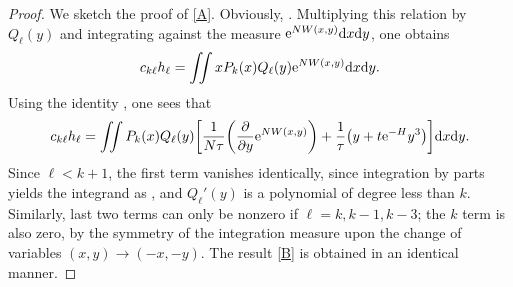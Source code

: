 \documentclass[10pt,a4paper]{amsart}
\numberwithin{equation}{section}
\begin{document}
\begin{proof}
 We sketch the proof of \eqref{A}. Obviously, . Multiplying this relation by $Q_{\ell}(y)$ and integrating against the measure ${\rm e}^{NW(x,y)}{\rm d}x{\rm d}y$, one obtains
 \begin{equation*}
 c_{k\ell}h_{\ell} =\iint xP_k(x) Q_{\ell}(y) {\rm e}^{NW(x,y)}{\rm d}x{\rm d}y.
 \end{equation*}
 Using the identity , one sees
 that
 \begin{equation*}
 c_{k\ell}h_{\ell} = \iint P_k(x) Q_{\ell}(y)\biggl[\frac{1}{N \tau}\biggl(\frac{\partial}{\partial y} {\rm e}^{NW(x,y)}\biggr) + \frac{1}{\tau}\bigl(y + t{\rm e}^{-H}y^3\bigr)\biggr]{\rm d}x{\rm d}y.
 \end{equation*}
 Since $\ell < k+1$, the first term vanishes identically, since integration by parts yields the integrand as ,
 and $Q_{\ell}'(y)$ is a polynomial of degree less than $k$. Similarly, last two terms can only be nonzero if $\ell = k,k-1,k-3$; the $k$ term is also
 zero, by the symmetry of the integration measure upon the change of variables $(x,y) \to (-x,-y)$. The result \eqref{B} is obtained in an identical manner.
\end{proof}
\end{document}
